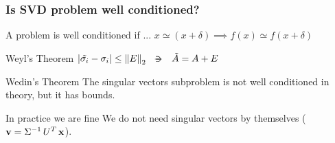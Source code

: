\begin{frame}[plain]
	\frametitle{Is SVD problem well conditioned?}
	\begin{block}{A problem is well conditioned if ... }
    $x \simeq (x+\delta) \implies f(x) \simeq f(x + \delta)$
	\end{block}   
	\begin{block}{Weyl's Theorem}
    $\abs{\tilde{\sigma_i} - \sigma_i} \le \norm{E}_2 \ds{\suchthat}
    \tilde{A} = A + E$
	\end{block}
	\begin{block}{Wedin's Theorem}
    The singular vectors subproblem is not well conditioned in theory,
    but it has bounds.
	\end{block}
	\begin{block}{In practice we are fine}
    We do not need singular vectors by themselves ($\mathbf{v} =
    {\Sigma}^{-1}\,{U}^{T}\,\mathbf{x}$).
	\end{block}
\end{frame}
